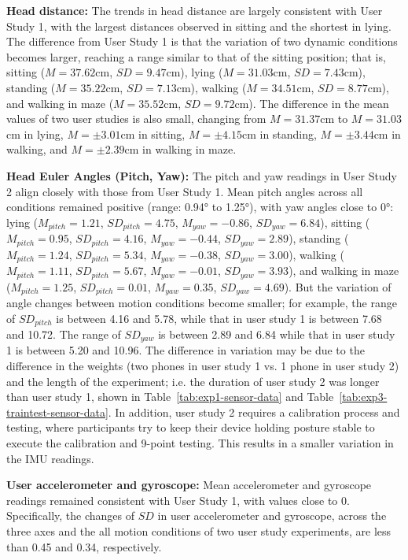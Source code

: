 \noindent\textbf{Head distance:} The trends in head distance are largely consistent with User Study 1, with the largest distances observed in sitting and the shortest in lying. The difference from User Study 1 is that the variation of two  dynamic conditions becomes larger, reaching a range similar to that of the sitting position; that is, sitting ($M=37.62$cm, $SD=9.47$cm), lying ($M=31.03$cm, $SD=7.43$cm), standing ($M=35.22$cm, $SD=7.13$cm), walking ($M=34.51$cm, $SD=8.77$cm), and walking in maze ($M=35.52$cm, $SD=9.72$cm). The difference in the mean values of two user studies is also small, changing from $M=31.37$cm to $M=31.03$cm in lying, $M = \pm3.01$cm in sitting, $M = \pm4.15$cm in standing, $M = \pm3.44$cm in walking, and $M = \pm2.39$cm in  walking in maze.


\noindent\textbf{Head Euler Angles (Pitch, Yaw):}  The pitch and yaw readings in User Study 2 align closely with those from User Study 1. Mean pitch angles across all conditions remained positive (range: 0.94° to 1.25°), with yaw angles close to 0°: lying ($M_{pitch} = 1.21$, $SD_{pitch} = 4.75$, $M_{yaw} = -0.86$, $SD_{yaw} = 6.84$), sitting ($M_{pitch} = 0.95$, $SD_{pitch} = 4.16$, $M_{yaw} = -0.44$, $SD_{yaw} = 2.89$), standing ($M_{pitch} = 1.24$, $SD_{pitch} = 5.34$, $M_{yaw} = -0.38$, $SD_{yaw} = 3.00$), walking ($M_{pitch} = 1.11$, $SD_{pitch} = 5.67$, $M_{yaw} = -0.01$, $SD_{yaw} = 3.93$), and walking in maze ($M_{pitch} = 1.25$, $SD_{pitch} = 0.01$, $M_{yaw} = 0.35$, $SD_{yaw} = 4.69$). But the variation of angle changes between motion conditions become smaller; for example, the range of $SD_{pitch}$ is between 4.16 and 5.78, while that in user study 1 is between 7.68 and 10.72.  The range of $SD_{yaw}$ is between 2.89 and 6.84 while that in user study 1 is between 5.20 and 10.96. The difference in variation may be due to the difference in the weights (two phones in user study 1 vs. 1 phone in user study 2) and the length of the experiment; i.e. the duration of user study 2 was longer than user study 1, shown in Table~\ref{tab:exp1-sensor-data} and Table~\ref{tab:exp3-traintest-sensor-data}. In addition, user study 2 requires a calibration process and testing, where participants try to keep their device holding posture stable to execute the calibration and 9-point testing. This results in a smaller variation in the IMU readings. 


\noindent\textbf{User accelerometer and gyroscope:} Mean accelerometer and gyroscope readings remained consistent with User Study 1, with values close to 0. Specifically, the changes of $SD$ in user accelerometer and gyroscope, across the three axes and the all motion conditions of two user study experiments, are less than 0.45 and 0.34, respectively. 


